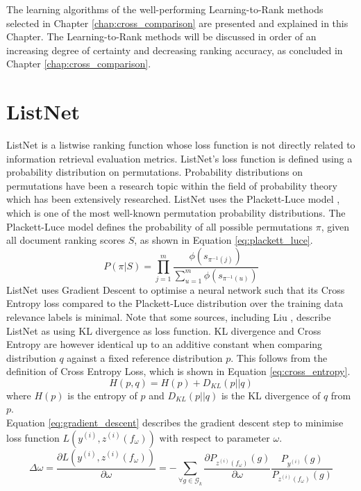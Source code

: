 \label{chap:ltr_methods}
The learning algorithms of the well-performing Learning-to-Rank methods selected in Chapter \ref{chap:cross_comparison} are presented and explained in this Chapter. The Learning-to-Rank methods will be discussed in order of an increasing degree of certainty and decreasing ranking accuracy, as concluded in Chapter \ref{chap:cross_comparison}.

\section{ListNet}
\label{sec:ltrmethods_listnet}
ListNet \cite{Cao2007} is a listwise ranking function whose loss function is not directly related to information retrieval evaluation metrics. ListNet's loss function is defined using a probability distribution on permutations. Probability distributions on permutations have been a research topic within the field of probability theory which has been extensively researched. ListNet uses the Plackett-Luce model \cite{Plackett1975,Luce1959}, which is one of the most well-known permutation probability distributions. The Plackett-Luce model defines the probability of all possible permutations $\pi$, given all document ranking scores $S$, as shown in Equation \ref{eq:plackett_luce}.
\begin{equation}
P(\pi|S) = \prod\limits_{j=1}^{m}\frac{\phi(s_{\pi^{-1}(j)})}{\sum\nolimits_{u=1}^{m}\phi(s_{\pi^{-1}(u)})}
\label{eq:plackett_luce}
\end{equation}
ListNet uses Gradient Descent to optimise a neural network such that its Cross Entropy loss compared to the Plackett-Luce distribution over the training data relevance labels is minimal. Note that some sources, including Liu \cite{Liu2007}, describe ListNet as using \ac{KL divergence} as loss function. \ac{KL divergence} and Cross Entropy are however identical up to an additive constant when comparing distribution $q$ against a fixed reference distribution $p$. This follows from the definition of Cross Entropy Loss, which is shown in Equation \ref{eq:cross_entropy}.
\begin{equation}
H(p,q) = H(p) + D_{KL}(p||q)
\label{eq:cross_entropy}
\end{equation}
where $H(p)$ is the entropy of $p$ and $D_{KL}(p||q)$ is the \ac{KL divergence} of $q$ from $p$.\\

\noindent Equation \ref{eq:gradient_descent} describes the gradient descent step to minimise loss function $L(y^{(i)},z^{(i)}(f_\omega))$ with respect to parameter $\omega$. 
\begin{equation}
\Delta\omega = \frac{\partial L(y^{(i)},z^{(i)}(f_\omega))}{\partial \omega} = - \sum_{\forall g \in \mathscr{G}_k}\limits\frac{\partial P_{z^{(i)}(f_\omega)}(g)}{\partial \omega}\frac{P_{y^{(i)}}(g)}{P_{z^{(i)}(f_\omega)}(g)}
\label{eq:gradient_descent}
\end{equation}

